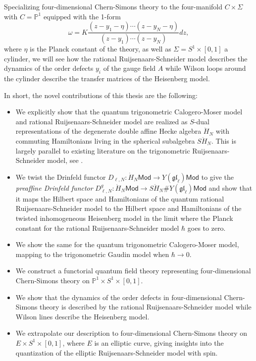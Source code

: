 \documentclass[11pt]{report}
\theoremstyle{definition}
\theoremstyle{remark}
\theoremstyle{remark}
\renewcommand{\P}{\mathbb{P}}
\begin{document}
Specializing four-dimensional Chern-Simons theory to the four-manifold $C \times \Sigma$ with $C = \P^1$ equipped with the 1-form
\begin{equation*}
\omega = K \frac{(z-y_1-\eta) \cdots (z-y_N-\eta)}{(z-y_1) \cdots (z-y_N)} dz,
\end{equation*}
where $\eta$ is the Planck constant of the theory, as well as $\Sigma = S^1 \times [0,1]$ a cylinder, we will see how the rational Ruijsenaars-Schneider model describes the dynamics of the order defects $y_i$ of the gauge field $A$ while Wilson loops around the cylinder describe the transfer matrices of the Heisenberg model.

In short, the novel contributions of this thesis are the following:
\begin{itemize}
\item We explicitly show that the quantum trigonometric Calogero-Moser model and rational Ruijsenaars-Schneider model are realized as $S$-dual representations of the degenerate double affine Hecke algebra $\ddot H_N$ with commuting Hamiltonians living in the spherical subalgebra $S\ddot H_N$. This is largely parallel to existing literature on the trigonometric Ruijsenaars-Schneider model, see \cite{article:lamers:2022}.
\item We twist the Drinfeld functor $D_{\ell,N}: \dot H_N \mathsf{Mod} \to Y(\mathfrak{gl}_\ell) \mathsf{Mod}$ to give the \emph{preaffine Drinfeld functor} $D_{\ell,N}^g: \ddot H_N \mathsf{Mod} \to S\ddot H_N \# Y(\mathfrak{gl}_\ell) \mathsf{Mod}$ and show that it maps the Hilbert space and Hamiltonians of the quantum rational Ruijsenaars-Schneider model to the Hilbert space and Hamiltonians of the twisted inhomogeneous Heisenberg model in the limit where the Planck constant for the rational Ruijsenaars-Schneider model $\hbar$ goes to zero.
\item We show the same for the quantum trigonometric Calogero-Moser model, mapping to the trigonometric Gaudin model when $\hbar \to 0$.
\item We construct a functorial quantum field theory representing four-dimensional Chern-Simons theory on $\P^1 \times S^1 \times [0,1]$.
\item We show that the dynamics of the order defects in four-dimensional Chern-Simons theory is described by the rational Ruijsenaars-Schneider model while Wilson lines describe the Heisenberg model.
\item We extrapolate our description to four-dimensional Chern-Simons theory on $E \times S^1 \times [0,1]$, where $E$ is an elliptic curve, giving insights into the quantization of the elliptic Ruijsenaars-Schneider model with spin.
\end{itemize}
\end{document}
